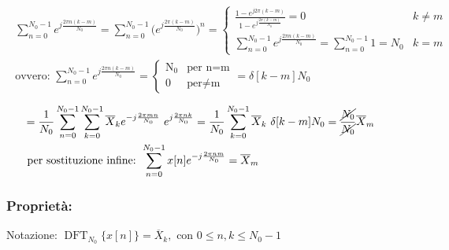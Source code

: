 \documentclass[
]{article}
\begin{document}
\begin{enumerate}
\begin{align*}
{\begin{array}{cl}
          \sum_{n=0}^{N_0-1}e^{j\frac{2\pi n(k-m)}{N_0}}=\sum_{n=0}^{N_0-1}\Bigg(e^{j\frac{2\pi(k-m)}{N_0}}\Bigg)^{n}=
          \left\{
          \begin{array}{cl}
              \displaystyle \frac{1-e^{j2\pi(k-m)}}{1-e^{j\frac{2\pi(k-m)}{N_0}}}=0 & k\neq m\\
              \displaystyle \sum_{n=0}^{N_0-1}e^{j\frac{2\pi n(k-m)}{N_0}}=\sum_{n=0}^{N_0-1}1=N_0 & k=m
          \end{array}\right. \\
          \text{ovvero: } \displaystyle\sum_{n=0}^{N_0-1}e^{j\frac{2\pi n(k-m)}{N_0}}=\left\{\begin{array}{cl}\text{N}_0&\text{per n=m}\\0&\text{per}\ne\text{m}\end{array}\right.= \delta[k-m] N_0
      \end{array}
  }
  \end{align*} \begin{align*}
  &=\frac{1}{N_0} \sum_{n=0}^{N_0 -1} \sum_{k=0}^{N_0 -1} \overline{X}_k e^{-j\frac{2\pi mn}{N_0}} \ e^{j\frac{2\pi nk}{N_0}} = \frac{1}{N_0}\sum_{k=0}^{N_0 -1} \overline{X}_k \ \delta[k-m] N_0 = \frac{\cancel{N_0}}{\cancel{N_0}} \overline{X}_m  \\
  &\text{ per sostituzione infine: } \sum_{n=0}^{N_0 -1} x[n] e^{-j\frac{2\pi nm}{N_0}} = \overline{X}_m&
  \end{align*}
\end{enumerate}

\subsubsection{Proprietà:}\label{proprietuxe0-1}

Notazione:
\(\operatorname{DFT}_{N_0}\Big\{x[n]\Big\} = \overline{X}_k, \text{ con } 0\leq n, k \leq N_0 -1\)
\end{document}
